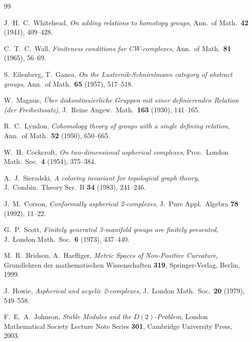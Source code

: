\documentclass[12pt,a4paper]{amsart}
\theoremstyle{definition}
\theoremstyle{remark}
\begin{document}
\begin{thebibliography}{99}

J.~H.~C.~Whitehead,
\textit{On adding relations to homotopy groups},
Ann.\ of Math.\ \textbf{42} (1941), 409--428.

C.~T.~C.~Wall,
\textit{Finiteness conditions for CW-complexes},
Ann.\ of Math.\ \textbf{81} (1965), 56--69.

S.~Eilenberg, T.~Ganea,
\textit{On the Lusternik-Schnirelmann category of abstract groups},
Ann.\ of Math.\ \textbf{65} (1957), 517--518.

W.~Magnus,
\textit{Über diskontinuierliche Gruppen mit einer definierenden Relation
(der Freiheitssatz)},
J.\ Reine Angew.\ Math.\ \textbf{163} (1930), 141--165.

R.~C.~Lyndon,
\textit{Cohomology theory of groups with a single defining relation},
Ann.\ of Math.\ \textbf{52} (1950), 650--665.

W.~H.~Cockcroft,
\textit{On two-dimensional aspherical complexes},
Proc.\ London Math.\ Soc.\ \textbf{4} (1954), 375--384.

A.~J.~Sieradski,
\textit{A coloring invariant for topological graph theory},
J.\ Combin.\ Theory Ser.\ B \textbf{34} (1983), 241--246.

J.~M.~Corson,
\textit{Conformally aspherical 2-complexes},
J.\ Pure Appl.\ Algebra \textbf{78} (1992), 11--22.

G.~P.~Scott,
\textit{Finitely generated 3-manifold groups are finitely presented},
J.\ London Math.\ Soc.\ \textbf{6} (1973), 437--440.

M.~R.~Bridson, A.~Haefliger,
\textit{Metric Spaces of Non-Positive Curvature},
Grundlehren der mathematischen Wissenschaften \textbf{319},
Springer-Verlag, Berlin, 1999.

J.~Howie,
\textit{Aspherical and acyclic 2-complexes},
J.\ London Math.\ Soc.\ \textbf{20} (1979), 549--558.

F.~E.~A.~Johnson,
\textit{Stable Modules and the $D(2)$-Problem},
London Mathematical Society Lecture Note Series \textbf{301},
Cambridge University Press, 2003.

\end{thebibliography}
\end{document}
